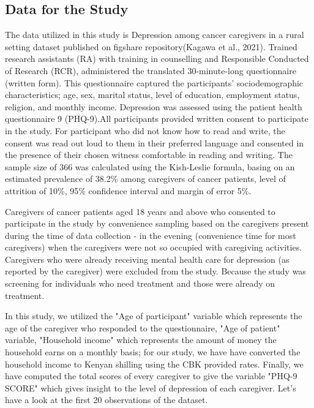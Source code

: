 \documentclass[11pt]{article}\usepackage[]{graphicx}\usepackage[]{xcolor}
\numberwithin{equation}{section}
\numberwithin{table}{section}
\begin{document}
\subsection{Data for the Study}
The data utilized in this study is Depression among cancer caregivers in a rural setting dataset published on figshare repository(Kagawa et al., 2021). Trained research assistants (RA) with training in counselling and Responsible Conducted of Research (RCR), administered the translated 30-minute-long questionnaire (written form). This questionnaire captured the participants' sociodemographic characteristics; age, sex, marital status, level of education, employment status, religion, and monthly income. Depression was assessed using the patient health questionnaire 9 (PHQ-9).All participants provided written consent to participate in the study. For participant who did not know how to read and write, the consent was read out loud to them in their preferred language and consented in the presence of their chosen witness comfortable in reading and writing.
The sample size of 366 was calculated using the Kish-Leslie formula, basing on an estimated prevalence of 38.2\% among caregivers of cancer patients, level of attrition of 10\%, 95\% confidence interval and margin of error 5\%.

\noindent Caregivers of cancer patients aged 18 years and above who consented to participate in the study by convenience sampling based on the caregivers present during the time of data collection - in the evening (convenience time for most caregivers) when the caregivers were not so occupied with caregiving activities. Caregivers who were already receiving mental health care for depression (as reported by the caregiver) were excluded from the study. Because the study was screening for individuals who need treatment and those were already on treatment.

\noindent In this study, we utilized the "Age of participant" variable which represents the age of the caregiver who responded to the questionnaire, "Age of patient" variable, "Household income" which represents the amount of money the household earns on a monthly basis; for our study, we have have converted the household income to Kenyan shilling using the CBK provided rates. Finally, we have  computed the total scores of every caregiver to give the variable "PHQ-9 SCORE" which gives insight to the level of depression of each caregiver.
\newpage
\noindent Let's have a look at the first 20 observations of the dataset.
\end{document}
